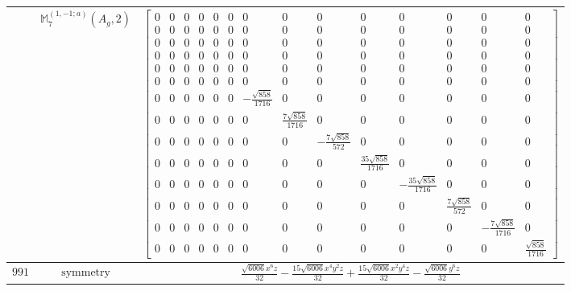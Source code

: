 \documentclass[fleqn,8pt,landscape]{jsarticle}
\begin{document}
\begin{longtable}{ccc}
$  $ & $ \mathbb{M}_{7}^{(1,-1;a)}(A_{g},2) $ & $ \begin{bmatrix} 0 & 0 & 0 & 0 & 0 & 0 & 0 & 0 & 0 & 0 & 0 & 0 & 0 & 0 \\ 0 & 0 & 0 & 0 & 0 & 0 & 0 & 0 & 0 & 0 & 0 & 0 & 0 & 0 \\ 0 & 0 & 0 & 0 & 0 & 0 & 0 & 0 & 0 & 0 & 0 & 0 & 0 & 0 \\ 0 & 0 & 0 & 0 & 0 & 0 & 0 & 0 & 0 & 0 & 0 & 0 & 0 & 0 \\ 0 & 0 & 0 & 0 & 0 & 0 & 0 & 0 & 0 & 0 & 0 & 0 & 0 & 0 \\ 0 & 0 & 0 & 0 & 0 & 0 & 0 & 0 & 0 & 0 & 0 & 0 & 0 & 0 \\ 0 & 0 & 0 & 0 & 0 & 0 & - \frac{\sqrt{858}}{1716} & 0 & 0 & 0 & 0 & 0 & 0 & 0 \\ 0 & 0 & 0 & 0 & 0 & 0 & 0 & \frac{7 \sqrt{858}}{1716} & 0 & 0 & 0 & 0 & 0 & 0 \\ 0 & 0 & 0 & 0 & 0 & 0 & 0 & 0 & - \frac{7 \sqrt{858}}{572} & 0 & 0 & 0 & 0 & 0 \\ 0 & 0 & 0 & 0 & 0 & 0 & 0 & 0 & 0 & \frac{35 \sqrt{858}}{1716} & 0 & 0 & 0 & 0 \\ 0 & 0 & 0 & 0 & 0 & 0 & 0 & 0 & 0 & 0 & - \frac{35 \sqrt{858}}{1716} & 0 & 0 & 0 \\ 0 & 0 & 0 & 0 & 0 & 0 & 0 & 0 & 0 & 0 & 0 & \frac{7 \sqrt{858}}{572} & 0 & 0 \\ 0 & 0 & 0 & 0 & 0 & 0 & 0 & 0 & 0 & 0 & 0 & 0 & - \frac{7 \sqrt{858}}{1716} & 0 \\ 0 & 0 & 0 & 0 & 0 & 0 & 0 & 0 & 0 & 0 & 0 & 0 & 0 & \frac{\sqrt{858}}{1716} \end{bmatrix} $ \\ \hline
$ 991 $ & $ \text{symmetry} $ & $ \frac{\sqrt{6006} x^{6} z}{32} - \frac{15 \sqrt{6006} x^{4} y^{2} z}{32} + \frac{15 \sqrt{6006} x^{2} y^{4} z}{32} - \frac{\sqrt{6006} y^{6} z}{32} $ \\

\end{longtable}
\end{document}
